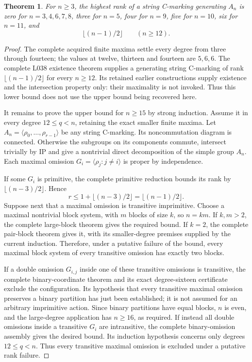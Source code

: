 \documentclass[11pt,a4paper]{article}
\newtheorem{theorem}{Theorem}
\newcommand{\gen}[1]{\langle#1\rangle}
\begin{document}
\begin{theorem}\label{principal}
For $n\ge3$, the highest rank of a string C-marking generating $A_n$ is
zero for $n=3,4,6,7,8$, three for $n=5$, four for $n=9$,
five for $n=10$, six for $n=11$, and
\[
                         \lfloor(n-1)/2\rfloor
                         \qquad(n\ge12).
\]
\end{theorem}
\begin{proof}
The complete acquired finite maxima settle every degree from
three through fourteen; the values at twelve, thirteen and
fourteen are $5,6,6$. The complete L038 existence theorem
supplies a generating string C-marking of rank
$\lfloor(n-1)/2\rfloor$ for every $n\ge12$. Its retained
earlier constructions supply existence and the intersection
property only: their maximality is not invoked. Thus this lower
bound does not use the upper bound being recovered here.

It remains to prove the upper bound for $n\ge15$ by strong
induction. Assume it in every degree $12\le q<n$, retaining
the exact smaller finite maxima. Let
$A_n=\gen{\rho_0,\ldots,\rho_{r-1}}$ be any string
C-marking. Its noncommutation diagram is connected. Otherwise
the subgroups on its components commute, intersect trivially
by IP and give a nontrivial direct decomposition of the simple
group $A_n$. Each maximal omission
$G_i=\gen{\rho_j:j\ne i}$ is proper by independence.

If some $G_i$ is primitive, the complete primitive reduction
bounds its rank by $\lfloor(n-3)/2\rfloor$. Hence
\[
             r\le1+\lfloor(n-3)/2\rfloor
                   =\lfloor(n-1)/2\rfloor.
\]
Suppose next that a maximal omission is transitive imprimitive.
Choose a maximal nontrivial block system, with $m$ blocks of
size $k$, so $n=km$. If $k,m>2$, the complete large-block
theorem gives the required bound. If $k=2$, the complete
pair-block theorem gives it, with its smaller-degree premises
supplied by the current induction. Therefore, under a putative
failure of the bound, every maximal block system of every
transitive omission has exactly two blocks.

If a double omission $G_{i,j}$ inside one of these transitive
omissions is transitive, the complete binary-coordinate theorem
and its exact degree-sixteen certificate exclude the configuration.
Its hypothesis that every transitive maximal omission preserves
a binary partition has just been established; it is not assumed
for an arbitrary imprimitive action. Since binary partitions
have equal blocks, $n$ is even, and the large-degree application
has $n\ge16$, as required. If instead
all double omissions inside a transitive $G_i$ are intransitive,
the complete binary-omission assembly gives the desired bound.
Its induction hypothesis concerns only degrees $12\le q<n$.
Thus every transitive maximal omission is excluded under a
putative rank failure.


\end{proof}
\end{document}
